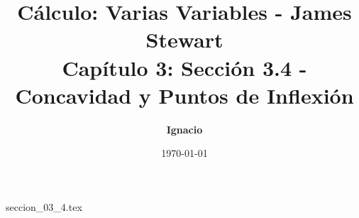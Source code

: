 \documentclass[11pt,spanish,oneside]{report}
\title{\textbf{Cálculo: Varias Variables - James Stewart} \\ \Large Capítulo 3: Sección 3.4 - Concavidad y Puntos de Inflexión}
\author{\textbf{Ignacio}}
\date{\today}
\begin{document}
\maketitle

{seccion_03_4.tex}
\end{document}
